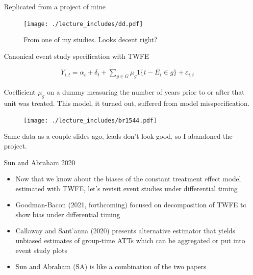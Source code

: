 \documentclass{beamer}
\begin{document}
\begin{frame}{Replicated from a project of mine}

	\begin{figure}
	\texttt{[image: ./lecture\_includes/dd.pdf]}
	\caption{From one of my studies. Looks decent right?}
	\end{figure}

\end{frame}

\begin{frame}{Canonical event study specification with TWFE}


\begin{eqnarray*}
Y_{i,t} = \alpha_i + \delta_t + \sum_{g \in G} \mu_g1\{t-E_i \in g \} + \varepsilon_{i,t}
\end{eqnarray*}

\bigskip

Coefficient $\mu_g$ on a dummy measuring the number of years prior to or after that unit was treated.  This model, it turned out, suffered from model misspecification. 

\end{frame}

\begin{frame}[plain]
	\begin{figure}
	\texttt{[image: ./lecture\_includes/br1544.pdf]}
	\end{figure}
	
Same data as a couple slides ago, leads don't look good, so I abandoned the project. 
	
\end{frame}





\begin{frame}{Sun and Abraham 2020}

\begin{itemize}
\item Now that we know about the biases of the constant treatment effect model estimated with TWFE, let's revisit event studies under differential timing
\item Goodman-Bacon (2021, forthcoming) focused on decomposition of TWFE to show bias under differential timing
\item Callaway and Sant'anna (2020) presents alternative estimator that yields unbiased estimates of group-time ATTs which can be aggregated or put into event study plots
\item Sun and Abraham (SA) is like a combination of the two papers
\end{itemize}

\end{frame}
\end{document}
